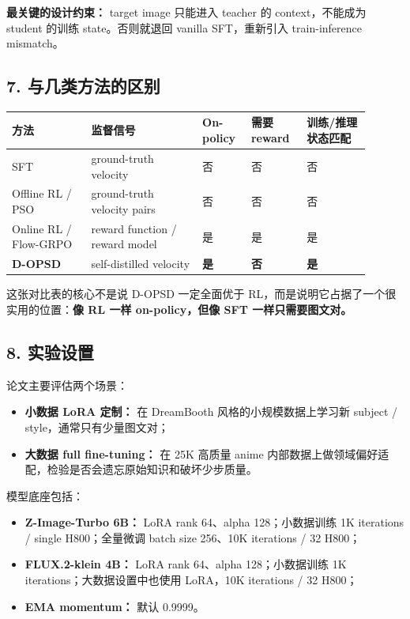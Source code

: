 \begin{summarybox}
\textbf{最关键的设计约束：} target image 只能进入 teacher 的 context，不能成为 student 的训练 state。否则就退回 vanilla SFT，重新引入 train-inference mismatch。
\end{summarybox}

\subsection{7. 与几类方法的区别}

\begin{center}
\small
\setlength{\tabcolsep}{4pt}
\begin{tabular}{p{0.20\linewidth}p{0.28\linewidth}p{0.12\linewidth}p{0.14\linewidth}p{0.16\linewidth}}
\toprule
\textbf{方法} & \textbf{监督信号} & \textbf{On-policy} & \textbf{需要 reward} & \textbf{训练/推理状态匹配} \\
\midrule
SFT & ground-truth velocity & 否 & 否 & 否 \\
Offline RL / PSO & ground-truth velocity pairs & 否 & 否 & 否 \\
Online RL / Flow-GRPO & reward function / reward model & 是 & 是 & 是 \\
\textbf{D-OPSD} & self-distilled velocity & \textbf{是} & \textbf{否} & \textbf{是} \\
\bottomrule
\end{tabular}
\end{center}

这张对比表的核心不是说 D-OPSD 一定全面优于 RL，而是说明它占据了一个很实用的位置：\textbf{像 RL 一样 on-policy，但像 SFT 一样只需要图文对。}

\subsection{8. 实验设置}

论文主要评估两个场景：

\begin{itemize}[leftmargin=1.5em]
  \item \textbf{小数据 LoRA 定制：} 在 DreamBooth 风格的小规模数据上学习新 subject / style，通常只有少量图文对；
  \item \textbf{大数据 full fine-tuning：} 在 25K 高质量 anime 内部数据上做领域偏好适配，检验是否会遗忘原始知识和破坏少步质量。
\end{itemize}

模型底座包括：

\begin{itemize}[leftmargin=1.5em]
  \item \textbf{Z-Image-Turbo 6B：} LoRA rank 64、alpha 128；小数据训练 1K iterations / single H800；全量微调 batch size 256、10K iterations / 32 H800；
  \item \textbf{FLUX.2-klein 4B：} LoRA rank 64、alpha 128；小数据训练 1K iterations；大数据设置中也使用 LoRA，10K iterations / 32 H800；
  \item \textbf{EMA momentum：} 默认 0.9999。
\end{itemize}

